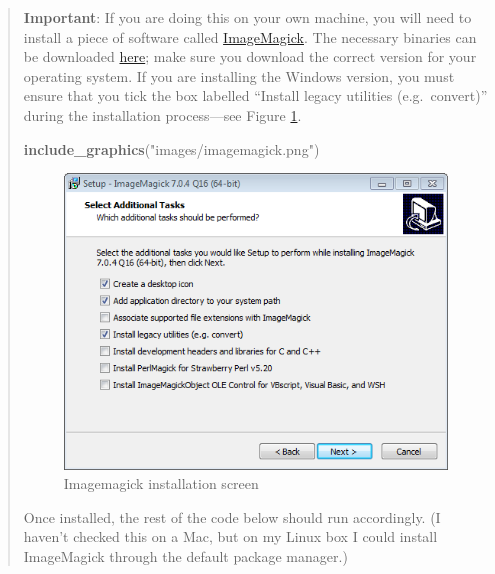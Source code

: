 \documentclass[]{book}
\newenvironment{Shaded}{\begin{snugshade}}{\end{snugshade}}
\newcommand{\KeywordTok}[1]{\textcolor[rgb]{0.13,0.29,0.53}{\textbf{{#1}}}}
\newcommand{\StringTok}[1]{\textcolor[rgb]{0.31,0.60,0.02}{{#1}}}
\newcommand{\NormalTok}[1]{{#1}}
\theoremstyle{definition}
\theoremstyle{definition}
\theoremstyle{definition}
\theoremstyle{remark}
\begin{document}
\begin{quote}
\textbf{Important}: If you are doing this on your own machine, you will
need to install a piece of software called
\href{https://www.imagemagick.org/script/index.php}{ImageMagick}. The
necessary binaries can be downloaded
\href{https://www.imagemagick.org/script/download.php\#windows}{here};
make sure you download the correct version for your operating system. If
you are installing the Windows version, you must ensure that you tick
the box labelled ``Install legacy utilities (e.g.~convert)'' during the
installation process---see Figure \ref{fig:imagemagick}.

\begin{Shaded}
\begin{Highlighting}[]
\KeywordTok{include_graphics}\NormalTok{(}\StringTok{"images/imagemagick.png"}\NormalTok{)}
\end{Highlighting}
\end{Shaded}

\begin{figure}

{\centering \includegraphics{images/imagemagick} 

}

\caption{Imagemagick installation screen}\label{fig:imagemagick}
\end{figure}

Once installed, the rest of the code below should run accordingly. (I
haven't checked this on a Mac, but on my Linux box I could install
ImageMagick through the default package manager.)
\end{quote}
\end{document}
